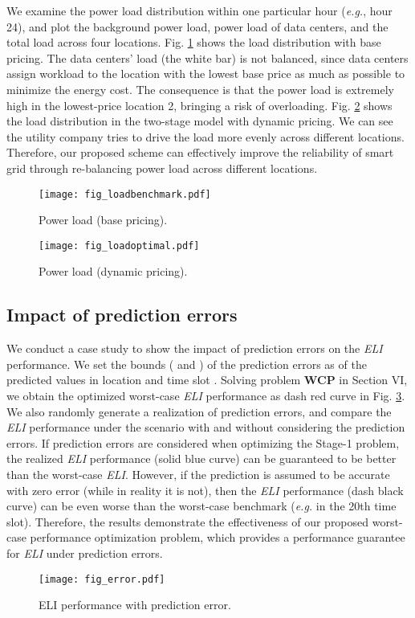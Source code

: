 \documentclass[journal]{IEEEtran}
\begin{document}
	
	We examine the power load distribution within one particular hour (\emph{e.g.}, hour 24), and plot the background power load, power load of data centers, and the total load across four locations. Fig. \ref{fig_loadbenchmark} shows the load distribution with base pricing. The data centers' load (the white bar) is not balanced, since data centers assign workload to the location with the lowest base price as much as possible to minimize the energy cost. The consequence is that the power load is extremely high in the lowest-price location 2, bringing a risk of overloading. Fig. \ref{fig_loadoptimal} shows the load distribution in the two-stage model with dynamic pricing. We can see the utility company tries to drive the load more evenly across different locations. Therefore, our proposed scheme can effectively improve the reliability of smart grid through re-balancing power load across different locations. 
	\begin{figure}[tbhp]
		\vspace{-2mm}
		\centering
		\texttt{[image: fig\_loadbenchmark.pdf]}
		\caption{\label{fig_loadbenchmark}Power load (base pricing).}
\end{figure}
	\begin{figure}[tbhp]
		\vspace{-2mm}
		\centering
		\texttt{[image: fig\_loadoptimal.pdf]}
		\caption{\label{fig_loadoptimal}Power load (dynamic pricing).}
		\vspace{-4mm}
	\end{figure}
		
	
	\subsection{Impact of prediction errors}
	We conduct a case study to show the impact of prediction errors on the \emph{ELI} performance. We set the bounds ( and ) of the prediction errors as  of the predicted values  in location  and time slot . Solving problem \textbf{WCP} in Section VI, we obtain the optimized worst-case \emph{ELI} performance as dash red curve in Fig. \ref{fig_error}. We also randomly generate a realization of prediction errors, and compare the \emph{ELI} performance under the scenario with and without considering the prediction errors. If prediction errors are considered when optimizing the Stage-1 problem, the realized \emph{ELI} performance (solid blue curve) can be guaranteed to be better than the worst-case \emph{ELI}. However, if the prediction is assumed to be accurate with zero error (while in reality it is not), then the \emph{ELI} performance (dash black curve) can be even worse than the worst-case benchmark (\emph{e.g.} in the 20th time slot). Therefore, the results demonstrate the effectiveness of our proposed worst-case performance optimization problem, which provides a performance guarantee for \emph{ELI} under prediction errors.
	\begin{figure}[tbhp]
\centering
		\texttt{[image: fig\_error.pdf]}
		\caption{\label{fig_error}ELI performance with prediction error.}
		\vspace{-4mm}
	\end{figure}
	
\end{document}

